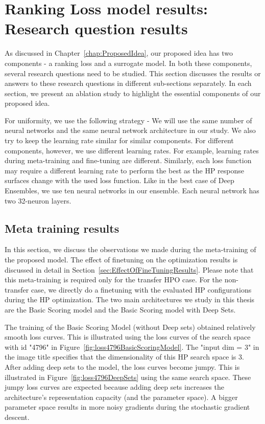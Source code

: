 \documentclass[12pt, twoside, ngerman]{report}
\begin{document}
\section{Ranking Loss model results: Research question results}

As discussed in Chapter~\ref{chap:ProposedIdea},  our proposed idea has two components - a ranking loss and a surrogate model.
In both these components, several research questions need to be studied.
This section discusses the results or answers to these research questions in different sub-sections separately.
In each section, we present an ablation study to highlight the essential components of our proposed idea.

For uniformity, we use the following strategy - We will use the same number of neural networks and the same neural network architecture in our study.
We also try to keep the learning rate similar for similar components.
For different components, however, we use different learning rates.
For example, learning rates during meta-training and fine-tuning are different.
Similarly, each loss function may require a different learning rate to perform the best as the HP response surfaces change with the used loss function.
Like in the best case of Deep Ensembles, we use ten neural networks in our ensemble. Each neural network has two 32-neuron layers.

\subsection{Meta training results}
In this section, we discuss the observations we made during the meta-training of the proposed model. The effect of finetuning on the optimization results is discussed in detail in Section~\ref{sec:EffectOfFineTuningResults}. Please note that this meta-training is required only for the transfer HPO case. For the non-transfer case, we directly do a finetuning with the evaluated HP configurations during the HP optimization.
The two main architectures we study in this thesis are the Basic Scoring model and the Basic Scoring model with Deep Sets. 

The training of the Basic Scoring Model (without Deep sets) obtained relatively smooth loss curves. This is illustrated using the loss curves of the search space with id "4796" in Figure~\ref{fig:loss4796BasicScoringModel}. The "input dim = 3" in the image title specifies that the dimensionality of this HP search space is 3. After adding deep sets to the model, the loss curves become jumpy. This is illustrated in Figure~\ref{fig:loss4796DeepSets} using the same search space. These jumpy loss curves are expected because adding deep sets increases the architecture's representation capacity (and the parameter space). A bigger parameter space results in more noisy gradients during the stochastic gradient descent. 
\end{document}
